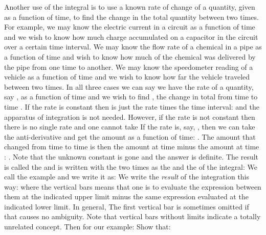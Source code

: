 {
Another use of the integral is to use a known rate of change of a quantity, given as a function of time, to find
the change in the total quantity between two times.
For example, we may know the electric current in a circuit as a function
of time and we wish to know how much charge accumulated on a capacitor in the circuit over a certain
time interval.
We may know the flow rate of a chemical in a pipe as a function of time and wish to know how much of the chemical
was delivered by the pipe from one time to another.
We may know the speedometer reading of a vehicle as a function of time and we wish to know
how far the vehicle traveled between two times.
In all three cases we can say we have the rate of a quantity, say , as a function of time and we wish to
find , the change in total  from time  to time .
%
%
If the rate is constant then  is just the rate times the time interval:
%
%
and the apparatus of integration is not needed.
However, if the rate is not constant then there is no single rate and one cannot take
If the rate is, say, , then we can take the anti-derivative and get the amount as
a function of time: .
The amount that  changed from time  to time  is then the amount at time  minus the
amount at time : .
Note that the unknown constant  is gone and the answer is definite.
The result is called the  and is written with the two times as the 
and the  of the integral:
%
%
We call the example  and we write it as:
%
%
We write the \textit{result} of the integration this way:
%
%
where the vertical bars means that one is to evaluate the expression between them at the indicated upper limit
minus the same expression evaluated at the indicated lower limit.
In general,
%
%
The first vertical bar is sometimes omitted if that causes no ambiguity.
Note that vertical bars without limits indicate  a totally unrelated concept.
Then for our example:
%
%
\tryit Show that:
%

}
